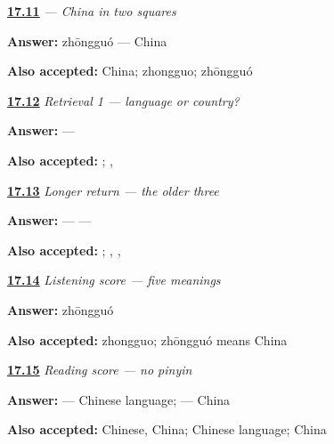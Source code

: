 \noindent\begin{minipage}[t]{\linewidth}
\raggedright
\hyperlink{review-ZH-C17-zhongguo-read}{\textbf{17.11}} \emph{ — China in two squares}\par
\small \textbf{Answer:} zhōngguó — China\par
\footnotesize \textbf{Also accepted:} China; zhongguo; zhōngguó
\end{minipage}\par\medskip

\noindent\begin{minipage}[t]{\linewidth}
\raggedright
\hyperlink{review-ZH-R17-country-language-r1-contrast}{\textbf{17.12}} \emph{Retrieval 1 — language or country?}\par
\small \textbf{Answer:}  — \par
\footnotesize \textbf{Also accepted:}  ; , 
\end{minipage}\par\medskip

\noindent\begin{minipage}[t]{\linewidth}
\raggedright
\hyperlink{review-ZH-R17-old-three-r2-recall}{\textbf{17.13}} \emph{Longer return — the older three}\par
\small \textbf{Answer:}  —  — \par
\footnotesize \textbf{Also accepted:}   ; , , 
\end{minipage}\par\medskip

\noindent\begin{minipage}[t]{\linewidth}
\raggedright
\hyperlink{review-ZH-R17-listening-five-contrast}{\textbf{17.14}} \emph{Listening score — five meanings}\par
\small \textbf{Answer:} zhōngguó\par
\footnotesize \textbf{Also accepted:} zhongguo; zhōngguó means China
\end{minipage}\par\medskip

\noindent\begin{minipage}[t]{\linewidth}
\raggedright
\hyperlink{review-ZH-R17-reading-five-pair}{\textbf{17.15}} \emph{Reading score — no pinyin}\par
\small \textbf{Answer:}  — Chinese language;  — China\par
\footnotesize \textbf{Also accepted:}  Chinese,  China; Chinese language; China
\end{minipage}\par\medskip

